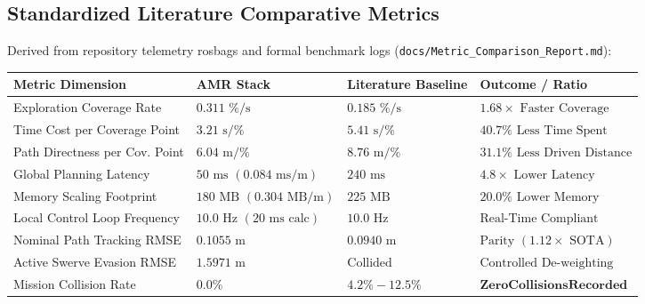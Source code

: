 \documentclass[10pt,a4paper]{article}
\begin{document}
\subsection{Standardized Literature Comparative Metrics}
Derived from repository telemetry rosbags and formal benchmark logs (\texttt{docs/Metric\_Comparison\_Report.md}):
\begin{center}
\small
\begin{tabular}{|l|l|l|l|}
\hline
\textbf{Metric Dimension} & \textbf{AMR Stack} & \textbf{Literature Baseline} & \textbf{Outcome / Ratio} \\
\hline
Exploration Coverage Rate & $0.311\text{ \%/s}$ & $0.185\text{ \%/s}$ & $\mathbf{1.68\times}\text{ Faster Coverage}$ \\
Time Cost per Coverage Point & $3.21\text{ s/\%}$ & $5.41\text{ s/\%}$ & $\mathbf{40.7\%}\text{ Less Time Spent}$ \\
Path Directness per Cov. Point & $6.04\text{ m/\%}$ & $8.76\text{ m/\%}$ & $\mathbf{31.1\%}\text{ Less Driven Distance}$ \\
Global Planning Latency & $50\text{ ms } (0.084\text{ ms/m})$ & $240\text{ ms}$ & $\mathbf{4.8\times}\text{ Lower Latency}$ \\
Memory Scaling Footprint & $180\text{ MB } (0.304\text{ MB/m})$ & $225\text{ MB}$ & $\mathbf{20.0\%}\text{ Lower Memory}$ \\
Local Control Loop Frequency & $10.0\text{ Hz } (20\text{ ms calc})$ & $10.0\text{ Hz}$ & $\text{Real-Time Compliant}$ \\
Nominal Path Tracking RMSE & $0.1055\text{ m}$ & $0.0940\text{ m}$ & $\text{Parity } (1.12\times\text{ SOTA})$ \\
Active Swerve Evasion RMSE & $1.5971\text{ m}$ & $\text{Collided}$ & $\text{Controlled De-weighting}$ \\
Mission Collision Rate & $\mathbf{0.0\%}$ & $4.2\% - 12.5\%$ & $\mathbf{Zero Collisions Recorded}$ \\
\hline
\end{tabular}
\end{center}
\end{document}
